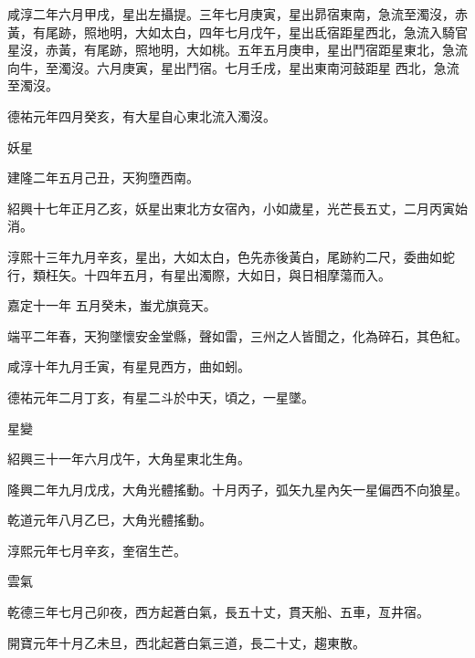 \begin{pinyinscope}
 咸淳二年六月甲戌，星出左攝提。三年七月庚寅，星出昴宿東南，急流至濁沒，赤黃，有尾跡，照地明，大如太白，四年七月戊午，星出氐宿距星西北，急流入騎官星沒，赤黃，有尾跡，照地明，大如桃。五年五月庚申，星出鬥宿距星東北，急流向牛，至濁沒。六月庚寅，星出鬥宿。七月壬戌，星出東南河鼓距星
 西北，急流至濁沒。



 德祐元年四月癸亥，有大星自心東北流入濁沒。



 妖星



 建隆二年五月己丑，天狗墮西南。



 紹興十七年正月乙亥，妖星出東北方女宿內，小如歲星，光芒長五丈，二月丙寅始消。



 淳熙十三年九月辛亥，星出，大如太白，色先赤後黃白，尾跡約二尺，委曲如蛇行，類枉矢。十四年五月，有星出濁際，大如日，與日相摩蕩而入。



 嘉定十一年
 五月癸未，蚩尤旗竟天。



 端平二年春，天狗墜懷安金堂縣，聲如雷，三州之人皆聞之，化為碎石，其色紅。



 咸淳十年九月壬寅，有星見西方，曲如蚓。



 德祐元年二月丁亥，有星二斗於中天，頃之，一星墜。



 星變



 紹興三十一年六月戊午，大角星東北生角。



 隆興二年九月戊戌，大角光體搖動。十月丙子，弧矢九星內矢一星偏西不向狼星。



 乾道元年八月乙巳，大角光體搖動。



 淳熙元年七月辛亥，奎宿生芒。



 雲氣



 乾德三年七月己卯夜，西方起蒼白氣，長五十丈，貫天船、五車，亙井宿。



 開寶元年十月乙未旦，西北起蒼白氣三道，長二十丈，趨東散。




\end{pinyinscope}

